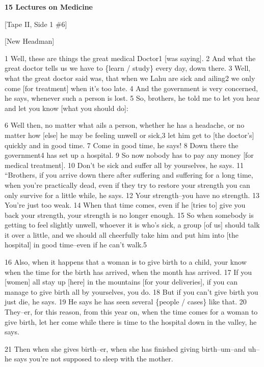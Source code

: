
\textbf{15 Lectures on Medicine }

[Tape II, Side 1 \#6]

[New Headman]

1 Well, these are things the great medical Doctor1 [was saying]. 2 And what the
great doctor tells us we have to \{learn / study\} every day, down there. 3 Well,
what the great doctor said was, that when we Lahu are sick and ailing2 we only
come [for treatment] when it's too late. 4 And the government is very concerned,
he says, whenever such a person is lost. 5 So, brothers, he told me to let you
hear and let you know [what you should do]:

6 Well then, no matter what ails a person, whether he has a headache, or no matter
how [else] he may be feeling unwell or sick,3 let him get to [the doctor's] quickly
and in good time. 7 Come in good time, he says! 8 Down there the government4 has
set up a hospital. 9 So now nobody has to pay any money [for medical treatment].
10 Don't be sick and suffer all by yourselves, he says. 11 ``Brothers,
if you arrive down there after suffering and suffering for a long time, when you're
practically dead, even if they try to restore your strength you can only survive
for a little while, he says. 12 Your strength--you have no strength. 13 You're
just too weak. 14 When that time comes, even if he [tries to] give you back your
strength, your strength is no longer enough. 15 So when somebody is getting to
feel slightly unwell, whoever it is who's sick, a group [of us] should talk it
over a little, and we should all cheerfully take him and put him into [the hospital]
in good time--even if he can't walk.5

16 Also, when it happens that a woman is to give birth to a child, your know when
the time for the birth has arrived, when the month has arrived. 17 If you [women]
all stay up [here] in the mountains [for your deliveries], if you can manage to
give birth all by yourselves, you do. 18 But if you can't give birth you just die,
he says. 19 He says he has seen several \{people / cases\} like that. 20 They--er,
for this reason, from this year on, when the time comes for a woman to give birth,
let her come while there is time to the hospital down in the valley, he says.

21 Then when she gives birth--er, when she has finished giving birth--um--and uh--he
says you're not supposed to sleep with the mother.

